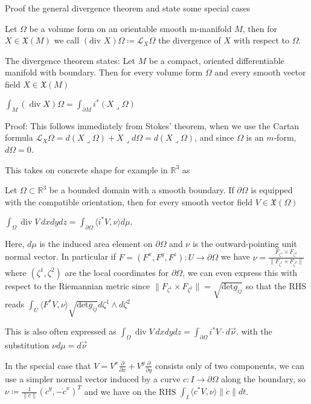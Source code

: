 Proof the general divergence theorem and state some special cases

Let \( \Omega \) be a volume form on an orientable smooth m-manifold \( M \),
then for \( X \in \mathfrak{X}(M) \) we call 
\( (\text{div } X)\Omega \coloneqq \mathcal{L}_{X}\Omega \)
the divergence of \( X \) with respect to \( \Omega \).

The divergence theorem states:
Let \(M\) be a compact, oriented differentiable manifold with boundary.
Then for every volume form \(\Omega\) and every smooth vector field \(X \in \mathfrak{X}(M)\)

\(\int_{M} (\operatorname{div} X) \Omega = \int_{\partial M} i^*(X \lrcorner \Omega)\)

Proof: This follows immediately from Stokes' theorem, when we use the Cartan formula
\(\mathcal{L}_X \Omega = d(X \lrcorner \Omega) + X \lrcorner d\Omega = d(X \lrcorner \Omega)\),
and since \( \Omega \) is an \( m \)-form, \( d\Omega = 0 \).

This takes on concrete shape for example in \( \mathbb{R}^{3} \) as

Let \(\Omega \subset \mathbb{R}^3\) be a bounded domain with a smooth boundary. 
If \(\partial \Omega\) is equipped with the compatible orientation, then for every smooth vector field \(V \in \mathfrak{X}(\Omega)\)

\(\int_{\Omega} \operatorname{div} V \, dxdydz = \int_{\partial \Omega} \langle i^*V, \nu \rangle d\mu.\)

Here, \(d\mu\) is the induced area element on \(\partial \Omega\) and \(\nu\) is the outward-pointing unit normal vector.
In particular if \( F = (F^x, F^y, F^z) : U \to \partial \Omega \) we have \( \nu = \frac{F_{\zeta^1} \times F_{\zeta^2}}{\|F_{\zeta^1} \times F_{\zeta^2}\|} \)
where \( (\zeta^1, \zeta^2) \) are the local coordinates for \( \partial \Omega \), we can even express this with respect to the Riemannian metric
since \( \|F_{\zeta^1} \times F_{\zeta^2}\| = \sqrt{\text{det}g_{ij}} \) so that the RHS reads 
\( \int_U \langle F^\ast V, \nu \rangle \sqrt{\text{det}g_{ij}} d\zeta^{1} \wedge d\zeta^{2} \)

This is also often expressed as
\(\int_{\Omega} \operatorname{div} V \, dxdydz = \int_{\partial \Omega} i^*V \cdot d\vec{\nu}.\)
with the substitution \( \nu d\mu = d\vec{\nu} \)

In the special case that \( V = V^x \frac{\partial}{\partial x} + V^y \frac{\partial}{\partial y}\) consists only of two components,
we can use a simpler normal vector induced by a curve \( c : I \to \partial \Omega \) along the boundary, so
\( \nu \coloneqq \frac{1}{\|\dot{c}\|}(\dot{c}^y, -\dot{c}^x)^T\) and we have on the RHS \( \int_{I} \langle c^\ast V, \nu \rangle \|\dot{c}\|dt \).

